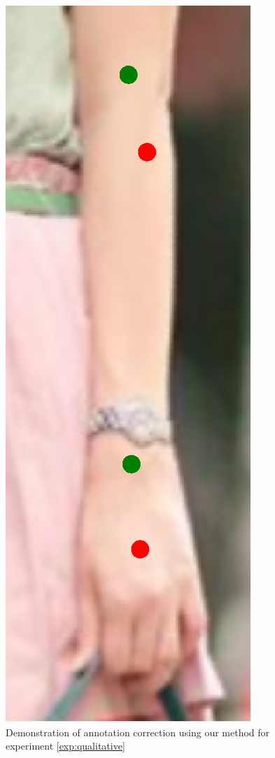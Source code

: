 \begin{figure}[t!]
    \includegraphics[height=\fh]{resources/Fixing/fix_19}
    \caption{Demonstration of annotation correction using our method for experiment \ref{exp:qualitative}}
    \label{fig:qualitative}
\end{figure}

